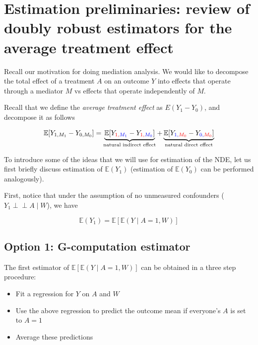 \documentclass[
  12pt,
]{book}
\providecommand{\tightlist}{%
  \setlength{\itemsep}{0pt}\setlength{\parskip}{0pt}}
\theoremstyle{definition}
\theoremstyle{definition}
\theoremstyle{definition}
\newcommand{\indep}{\mbox{$\perp\!\!\!\perp$}}
\newcommand{\E}{\mathbb{E}}
\newcommand{\1}{\mathbbm{1}}
\begin{document}
\hypertarget{estimation-preliminaries-review-of-doubly-robust-estimators-for-the-average-treatment-effect}{%
\chapter{Estimation preliminaries: review of doubly robust estimators for the average treatment effect}\label{estimation-preliminaries-review-of-doubly-robust-estimators-for-the-average-treatment-effect}}

Recall our motivation for doing mediation analysis. We would like to decompose
the total effect of a treatment \(A\) on an outcome \(Y\) into effects that operate
through a mediator \(M\) vs effects that operate independently of \(M\).

Recall that we define the \emph{average treatment effect} as \(E(Y_1-Y_0)\), and
decompose it as follows

\begin{equation*}
\E[Y_{1,M_1} - Y_{0,M_0}] = \underbrace{\E[Y_{\color{red}{1},\color{blue}{M_1}} -
    Y_{\color{red}{1},\color{blue}{M_0}}]}_{\text{natural indirect effect}} +
    \underbrace{\E[Y_{\color{blue}{1},\color{red}{M_0}} -
    Y_{\color{blue}{0},\color{red}{M_0}}]}_{\text{natural direct effect}}
\end{equation*}

To introduce some of the ideas that we will use for estimation of the NDE, let
us first briefly discuss estimation of \(\E(Y_1)\) (estimation of \(\E(Y_0)\) can be
performed analogously).

First, notice that under the assumption of no unmeasured confounders (\(Y_1\indep A\mid W\)), we have

\[ \E(Y_1) = \E[ \E(Y \mid A=1, W) ]\]

\hypertarget{option-1-g-computation-estimator}{%
\section{Option 1: G-computation estimator}\label{option-1-g-computation-estimator}}

The first estimator of \(\E[ \E(Y \mid A=1, W)]\) can be obtained in a
three step procedure:

\begin{itemize}
\tightlist
\item
  Fit a regression for \(Y\) on \(A\) and \(W\)
\item
  Use the above regression to predict the outcome mean if everyone's
  \(A\) is set to \(A=1\)
\item
  Average these predictions
\end{itemize}
\end{document}
